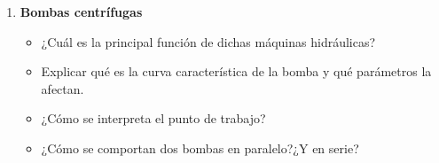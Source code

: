 \begin{itemize}
\begin{enumerate}
      \item {\bf Bombas centrífugas}

      \begin{itemize}
      \item ¿Cuál es la principal función de dichas máquinas hidráulicas? 
	\item Explicar qué es la curva característica de la bomba y qué parámetros la afectan.
	\item ¿Cómo se interpreta el punto de trabajo?
	\item ¿Cómo se comportan dos bombas en paralelo?¿Y en serie?
      \end{itemize}

      \end{enumerate}
  \end{itemize}
